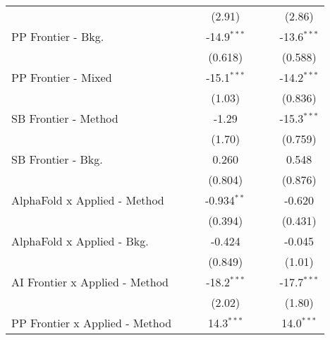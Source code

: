 \begin{tabular}{lcccccc}
                                  &                &                & (2.91)        &                &               & (2.86)\\   
   PP Frontier - Bkg.             &                &                & -14.9$^{***}$ &                &               & -13.6$^{***}$\\   
                                  &                &                & (0.618)       &                &               & (0.588)\\   
   PP Frontier - Mixed            &                &                & -15.1$^{***}$ &                &               & -14.2$^{***}$\\   
                                  &                &                & (1.03)        &                &               & (0.836)\\   
   SB Frontier - Method           &                &                & -1.29         &                &               & -15.3$^{***}$\\   
                                  &                &                & (1.70)        &                &               & (0.759)\\   
   SB Frontier - Bkg.             &                &                & 0.260         &                &               & 0.548\\   
                                  &                &                & (0.804)       &                &               & (0.876)\\   
   AlphaFold x Applied - Method   &                &                & -0.934$^{**}$ &                &               & -0.620\\   
                                  &                &                & (0.394)       &                &               & (0.431)\\   
   AlphaFold x Applied - Bkg.     &                &                & -0.424        &                &               & -0.045\\   
                                  &                &                & (0.849)       &                &               & (1.01)\\   
   AI Frontier x Applied - Method &                &                & -18.2$^{***}$ &                &               & -17.7$^{***}$\\   
                                  &                &                & (2.02)        &                &               & (1.80)\\   
   PP Frontier x Applied - Method &                &                & 14.3$^{***}$  &                &               & 14.0$^{***}$\\   

\end{tabular}
